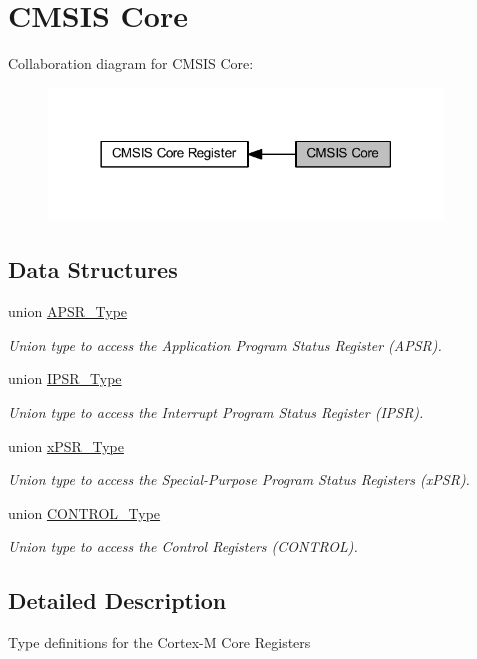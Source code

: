 \hypertarget{group___c_m_s_i_s___c_o_r_e}{}\section{C\+M\+S\+IS Core}
\label{group___c_m_s_i_s___c_o_r_e}
Collaboration diagram for C\+M\+S\+IS Core\+:\nopagebreak
\begin{figure}[H]
\begin{center}
\leavevmode
\includegraphics[width=297pt]{group___c_m_s_i_s___c_o_r_e}
\end{center}
\end{figure}
\subsection*{Data Structures}
\begin{DoxyCompactItemize}
\item 
union \hyperlink{union_a_p_s_r___type}{A\+P\+S\+R\+\_\+\+Type}
\begin{DoxyCompactList}\small\item\em Union type to access the Application Program Status Register (A\+P\+SR). \end{DoxyCompactList}\item 
union \hyperlink{union_i_p_s_r___type}{I\+P\+S\+R\+\_\+\+Type}
\begin{DoxyCompactList}\small\item\em Union type to access the Interrupt Program Status Register (I\+P\+SR). \end{DoxyCompactList}\item 
union \hyperlink{unionx_p_s_r___type}{x\+P\+S\+R\+\_\+\+Type}
\begin{DoxyCompactList}\small\item\em Union type to access the Special-\/\+Purpose Program Status Registers (x\+P\+SR). \end{DoxyCompactList}\item 
union \hyperlink{union_c_o_n_t_r_o_l___type}{C\+O\+N\+T\+R\+O\+L\+\_\+\+Type}
\begin{DoxyCompactList}\small\item\em Union type to access the Control Registers (C\+O\+N\+T\+R\+OL). \end{DoxyCompactList}\end{DoxyCompactItemize}


\subsection{Detailed Description}
Type definitions for the Cortex-\/M Core Registers 